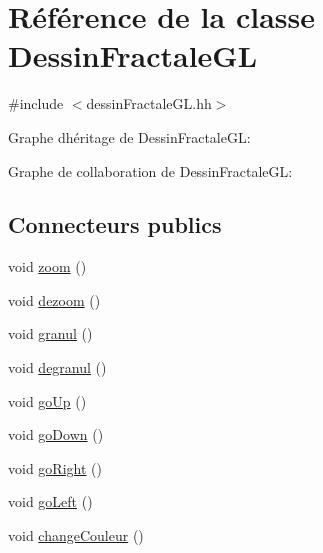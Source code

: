 \hypertarget{classDessinFractaleGL}{}\section{Référence de la classe Dessin\+Fractale\+GL}
\label{classDessinFractaleGL}


{\ttfamily \#include $<$dessin\+Fractale\+G\+L.\+hh$>$}



Graphe d\textquotesingle{}héritage de Dessin\+Fractale\+GL\+:


Graphe de collaboration de Dessin\+Fractale\+GL\+:
\subsection*{Connecteurs publics}
\begin{DoxyCompactItemize}
\item 
void \hyperlink{classDessinFractaleGL_a2ca7a7e0c01a8b1e5b6587b5d087bc8d}{zoom} ()
\item 
void \hyperlink{classDessinFractaleGL_ac3eee50451126a4df2476ee86157457a}{dezoom} ()
\item 
void \hyperlink{classDessinFractaleGL_ae05d9f2b35e02a5e71ff0a58b382d121}{granul} ()
\item 
void \hyperlink{classDessinFractaleGL_ae07214922c9675f6b0a0da825f85bb1d}{degranul} ()
\item 
void \hyperlink{classDessinFractaleGL_a0bffca09a6c44bbcc7e4ee7e5d7357fb}{go\+Up} ()
\item 
void \hyperlink{classDessinFractaleGL_a429ba25774e220a73e18b60a807a0f98}{go\+Down} ()
\item 
void \hyperlink{classDessinFractaleGL_a1be6d62d662d8321fd652a1524eaaffd}{go\+Right} ()
\item 
void \hyperlink{classDessinFractaleGL_ac4ac5c40ce706f55629c8b60f23b4082}{go\+Left} ()
\item 
void \hyperlink{classDessinFractaleGL_a1c8787f969da8312ba3dbaa82f09ec5a}{change\+Couleur} ()
\end{DoxyCompactItemize}
